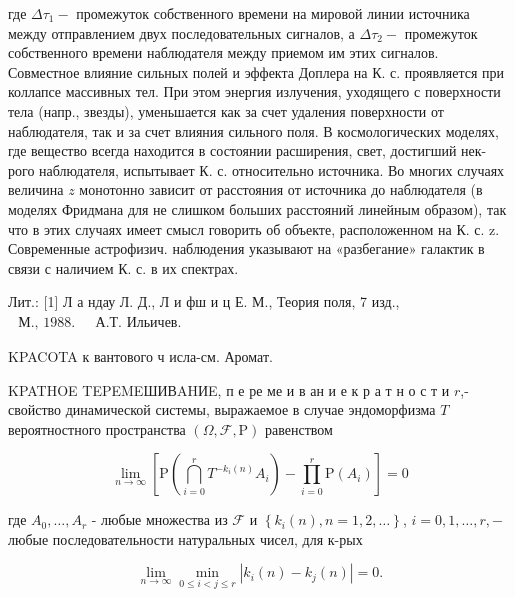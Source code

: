 \documentclass[10pt]{article}
\begin{document}
где $\Delta \tau_{1}-$ промежуток собственного времени на мировой линии источника между отправлением двух последовательных сигналов, а $\Delta \tau_{2}-$ промежуток собственного времени наблюдателя между приемом им этих сигналов. Совместное влияние сильных полей и эффекта Доплера на К. с. проявляется при коллапсе массивных тел. При этом энергия излучения, уходящего с поверхности тела (напр., звезды), уменьшается как за счет удаления поверхности от наблюдателя, так и за счет влияния сильного поля. В космологических моделях, где вещество всегда находится в состоянии расширения, свет, достигший нек-рого наблюдателя, испытывает К. с. относительно источника. Во многих случаях величина $z$ монотонно зависит от расстояния от источника до наблюдателя (в моделях Фридмана для не слишком больших расстояний линейным образом), так что в этих случаях имеет смысл говорить об объекте, расположенном на К. с. z. Современные астрофизич. наблюдения указывают на «разбегание» галактик в связи с наличием К. с. в их спектрах.



Лит.: [1] Л а ндау Л. Д., Л и фш и ц Е. М., Теория поля, 7 изд., $\begin{array}{ll}\text { М., 1988. } & \text { А.Т. Ильичев. }\end{array}$



KPACOTA к вантового ч исла-см. Аромат.



KPATHOE TEPEMEШИВAHИE, п е ре ме и в ан и е к р а т н о с т и $r$,- свойство динамической системы, выражаемое в случае эндоморфизма $T$ вероятностного пространства $(\Omega, \mathscr{F}, \mathrm{P})$ равенством



\[

\lim _{n \rightarrow \infty}\left[\mathrm{P}\left(\bigcap_{i=0}^{r} T^{-k_{i}(n)} A_{i}\right)-\prod_{i=0}^{r} \mathrm{P}\left(A_{i}\right)\right]=0

\]



где $A_{0}, \ldots, A_{r}$ - любые множества из $\mathscr{F}$ и $\left\{k_{i}(n), n=1,2, \ldots\right\}$, $i=0,1, \ldots, r,-$ любые последовательности натуральных чисел, для к-рых



\[

\lim _{n \rightarrow \infty} \min _{0 \leqslant i<j \leqslant r}\left|k_{i}(n)-k_{j}(n)\right|=0 .

\]
\end{document}
